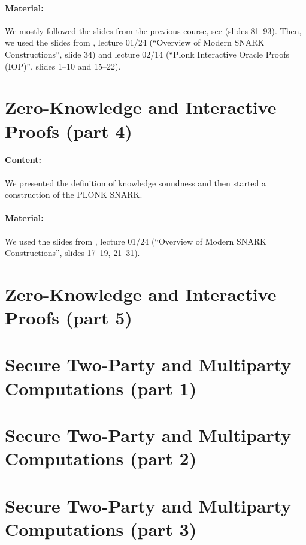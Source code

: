 \documentclass{llncs}
\begin{document}
\paragraph{Material:} We mostly followed the slides from the previous course, see \cite{ZK}  (slides 81--93). Then, we used the slides from \cite{ZKlearning}, lecture 01/24 (``Overview of Modern SNARK Constructions'', slide 34) and lecture 02/14 (``Plonk Interactive Oracle Proofs (IOP)'', slides 1--10 and 15--22).




\section{Zero-Knowledge and Interactive Proofs (part 4)}

\paragraph{Content:} 
We presented the definition of knowledge soundness and then started a construction of the PLONK SNARK.




\paragraph{Material:} We used the slides from \cite{ZKlearning}, lecture 01/24 (``Overview of Modern SNARK Constructions'', slides 17--19, 21--31).



\section{Zero-Knowledge and Interactive Proofs (part 5)}

\section{Secure Two-Party and Multiparty Computations (part 1)}

\section{Secure Two-Party and Multiparty Computations (part 2)}

\section{Secure Two-Party and Multiparty Computations (part 3)}
\end{document}
